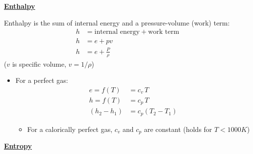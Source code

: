 \Large \textbf{\underline{\color{red}Enthalpy\color{black}}}
\vspace{5mm}

Enthalpy is the sum of internal energy and a pressure-volume (work) term:
\begin{align*}
    h &= \text{internal energy} + \text{work term} \\
    h &= e + pv \\
    h &= e + \frac{P}{\rho}
\end{align*}
($v$ is specific volume, $v=1/\rho$)

\begin{itemize}
    \item For a perfect gas:
    \begin{align*}
        e = f(T) &= c_v \, T \\
        h = f(T) &= c_p \, T \\
        (h_2 - h_1) &= c_p (T_2 - T_1) 
    \end{align*}
    \begin{itemize}
        \item For a calorically perfect gas, $c_v$ and $c_p$ are constant (holds for $T< 1000 K$)
    \end{itemize}
\end{itemize}

\vspace{5mm}

\Large \textbf{\underline{\color{red}Entropy\color{black}}}

